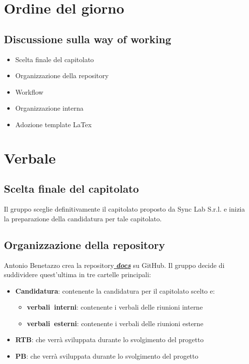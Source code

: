\documentclass[italian,12pt]{article} %
\begin{document}
\section{Ordine del giorno}
\subsection{Discussione sulla way of working}
\begin{flushleft}
	\begin{itemize}
		\item Scelta finale del capitolato
		\item Organizzazione della repository
		\item Workflow
		\item Organizzazione interna
		\item Adozione template LaTex
	\end{itemize}
\end{flushleft}


\newpage

\section{Verbale}
\subsection{Scelta finale del capitolato}
\begin{flushleft}
	Il gruppo sceglie definitivamente il capitolato proposto da Sync Lab S.r.l. e inizia la preparazione della candidatura per tale capitolato.
\end{flushleft}
\subsection{Organizzazione della repository}
\begin{flushleft}
	Antonio Benetazzo crea la repository\href{https://github.com/7Last/docs}{ \textbf{\textit{docs}}} su GitHub.
	Il gruppo decide di suddividere quest'ultima in tre cartelle principali: 
	\begin{itemize}
		\item \textbf{Candidatura}: contenente la candidatura per il capitolato scelto e:
		\begin{itemize}
			\item \textbf{verbali\ interni}: contenente i verbali delle riunioni interne
			\item \textbf{verbali\ esterni}: contenente i verbali delle riunioni esterne
			\end{itemize}
		\item \textbf{RTB}: che verrà sviluppata durante lo svolgimento del progetto
		\item \textbf{PB}: che verrà sviluppata durante lo svolgimento del progetto
	\end{itemize}
\end{flushleft}
\end{document}
